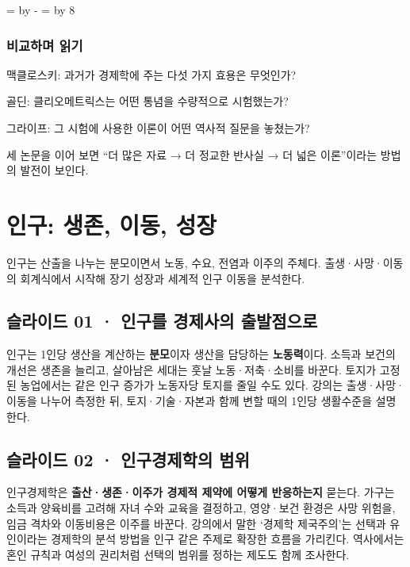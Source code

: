 \documentclass[10pt,a4paper]{article}
\newcommand{\ReserveReadingSectionSpace}{%
  \par\begingroup
  \dimen0=\pagegoal \advance\dimen0 by -\pagetotal
  \dimen2=\baselineskip \multiply\dimen2 by 8
  \ifdim\dimen0<\dimen2 \newpage\fi
  \endgroup}
\begin{document}
\ReserveReadingSectionSpace
\subsubsection*{비교하며 읽기}

\noindent\textbullet 맥클로스키: 과거가 경제학에 주는 다섯 가지 효용은 무엇인가?\par
\noindent\textbullet 골딘: 클리오메트릭스는 어떤 통념을 수량적으로 시험했는가?\par
\noindent\textbullet 그라이프: 그 시험에 사용한 이론이 어떤 역사적 질문을 놓쳤는가?\par

세 논문을 이어 보면 “더 많은 자료 → 더 정교한 반사실 → 더 넓은 이론”이라는 방법의 발전이 보인다.\par


\section{인구: 생존, 이동, 성장}
인구는 산출을 나누는 분모이면서 노동, 수요, 전염과 이주의 주체다. 출생·사망·이동의 회계식에서 시작해 장기 성장과 세계적 인구 이동을 분석한다.\par

\subsection{슬라이드 01 · 인구를 경제사의 출발점으로}
인구는 1인당 생산을 계산하는 \textbf{분모}이자 생산을 담당하는 \textbf{노동력}이다. 소득과 보건의 개선은 생존을 늘리고, 살아남은 세대는 훗날 노동·저축·소비를 바꾼다. 토지가 고정된 농업에서는 같은 인구 증가가 노동자당 토지를 줄일 수도 있다. 강의는 출생·사망·이동을 나누어 측정한 뒤, 토지·기술·자본과 함께 변할 때의 1인당 생활수준을 설명한다.\par

\subsection{슬라이드 02 · 인구경제학의 범위}
인구경제학은 \textbf{출산·생존·이주가 경제적 제약에 어떻게 반응하는지} 묻는다. 가구는 소득과 양육비를 고려해 자녀 수와 교육을 결정하고, 영양·보건 환경은 사망 위험을, 임금 격차와 이동비용은 이주를 바꾼다. 강의에서 말한 ‘경제학 제국주의’는 선택과 유인이라는 경제학의 분석 방법을 인구 같은 주제로 확장한 흐름을 가리킨다. 역사에서는 혼인 규칙과 여성의 권리처럼 선택의 범위를 정하는 제도도 함께 조사한다.\par
\end{document}
